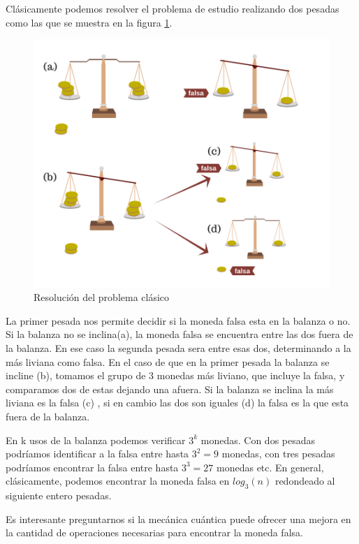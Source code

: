 \documentclass{article}
\begin{document}
Clásicamente podemos resolver el problema de estudio realizando dos pesadas como las que se muestra en la figura  \ref{fig:1}.
\begin{center}
    
\begin{figure}[h]
    \centering
    \includegraphics[scale=0.5]{img/falsa(1).png}
    \caption{Resolución del problema clásico}
    \label{fig:1}
\end{figure}
\end{center}

La primer pesada nos permite decidir si la moneda falsa esta en la balanza o no. Si la balanza no se inclina(a), la moneda falsa se encuentra entre las dos fuera de la balanza. En ese caso la segunda pesada sera entre esas dos, determinando a la más liviana como falsa.
En el caso de que en la primer pesada la balanza se incline (b), tomamos el grupo de 3 monedas más liviano, que incluye la falsa, y comparamos dos de estas dejando una afuera. Si la balanza se inclina la más liviana es la falsa (c) , si en cambio las dos son iguales (d) la falsa es la que esta fuera de la balanza. 

En k usos de la balanza podemos verificar $3^k$ monedas. Con dos pesadas podríamos identificar a la falsa entre hasta $3^2=9$ monedas, con tres pesadas podríamos encontrar la falsa entre hasta $3^3=27$ monedas etc.
En general, clásicamente,  podemos encontrar la moneda falsa en $log_3(n)$ redondeado al siguiente entero pesadas. 

Es interesante preguntarnos si la mecánica cuántica puede ofrecer una mejora en la cantidad de operaciones necesarias para encontrar la moneda falsa. 
\end{document}

